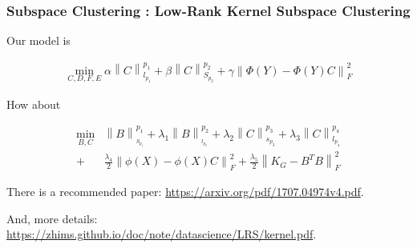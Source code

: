 \documentclass[aspectratio=2516]{beamer}
\begin{document}
\begin{frame}
\frametitle{ \small Subspace Clustering \uppercase\expandafter{}: Low-Rank Kernel Subspace Clustering}

Our model is 

\begin{equation}
\begin{split}
\mathop {\min }\limits_{C,D,F,E} \alpha \left\| C \right\|_{{l_{p_{1}}}}^{p_{1}}  + \beta \left\| C \right\|_{{S_{p_{2}}}}^{p_{2}} + \gamma \left\| {\Phi \left( Y \right) - \Phi \left( Y \right)C} \right\|_F^{\text{2}}
\end{split}
\end{equation}

How about 

\begin{equation}
\begin{split}
\mathop {\min }\limits_{B,C} & \left\| B \right\|_{_{{S_{{p_1}}}}}^{{p_1}} + {\lambda _1}\left\| B \right\|_{_{{l_{{p_2}}}}}^{{p_2}} + {\lambda _2}\left\| C \right\|_{{s_{{p_3}}}}^{{p_3}} + {\lambda _3}\left\| C \right\|_{{l_{{p_4}}}}^{{p_4}} \\
  + & \frac{{{\lambda _4}}}{2}\left\| {\phi \left( X \right) - \phi \left( X \right)C} \right\|_F^2 + \frac{{{\lambda _5}}}{2}\left\| {{K_G} - {B^T}B} \right\|_F^2
\end{split}
\label{eq13}
\end{equation}

\vspace{0.25cm}

{\tiny There is a recommended paper: {\color{blue} \url{https://arxiv.org/pdf/1707.04974v4.pdf}}}.

\vspace{0.25cm}


{\tiny And, more details:} {\color{blue} \tiny \url{https://zhims.github.io/doc/note/datascience/LRS/kernel.pdf}}.

\end{frame}

\end{document}
